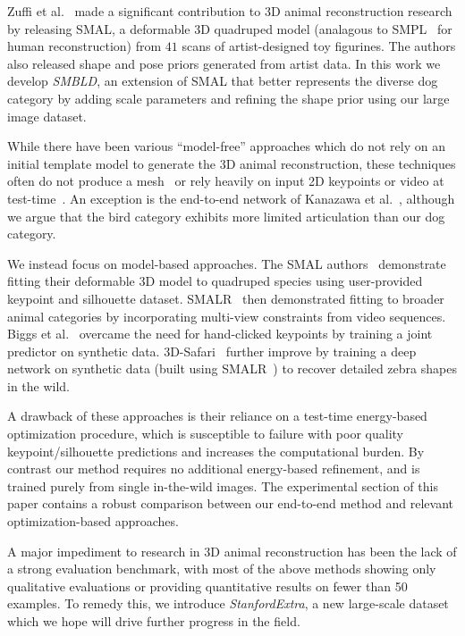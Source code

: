 
Zuffi et al.~\cite{zuffi2017menagerie} made a significant contribution to 3D animal reconstruction research by releasing SMAL, a deformable 3D quadruped model (analagous to SMPL~\cite{loper15smpl} for human reconstruction) from $41$ scans of artist-designed toy figurines. The authors also released shape and pose priors generated from artist data. In this work we develop \emph{SMBLD}, an extension of SMAL that better represents the diverse dog category by adding scale parameters and refining the shape prior using our large image dataset.

While there have been various ``model-free'' approaches which do not rely on an initial template model to generate the 3D animal reconstruction, these techniques often do not produce a mesh~\cite{Agudo_2018_CVPR,novotny19c3dpo} or rely heavily on input 2D keypoints or video at test-time~\cite{vicente_3dv,Probst2018_ECCVa}. An exception is the end-to-end network of Kanazawa et al.~\cite{kanazawa2018birds}, although we argue that the bird category exhibits more limited articulation than our dog category.

We instead focus on model-based approaches. The SMAL authors~\cite{zuffi2017menagerie} demonstrate fitting their deformable 3D model to quadruped species using user-provided keypoint and silhouette dataset. SMALR~\cite{zuffi_lions} then demonstrated fitting to broader animal categories by incorporating multi-view constraints from video sequences. Biggs et al.~\cite{biggs2018creatures} overcame the need for hand-clicked keypoints by training a joint predictor on synthetic data. 3D-Safari~\cite{Zuffi19Safari} further improve by training a deep network on synthetic data (built using SMALR~\cite{zuffi_lions}) to recover detailed zebra shapes in the wild.

A drawback of these approaches is their reliance on a test-time energy-based optimization procedure, which is susceptible to failure with poor quality keypoint/silhouette predictions and increases the computational burden. By contrast our method requires no additional energy-based refinement, and is trained purely from single in-the-wild images. The experimental section of this paper contains a robust comparison between our end-to-end method and relevant optimization-based approaches. 


A major impediment to research in 3D animal reconstruction has been the lack of a strong evaluation benchmark, with most of the above methods showing only qualitative evaluations or providing quantitative results on fewer than 50 examples. To remedy this, we introduce \emph{StanfordExtra}, a new large-scale dataset which we hope will drive further progress in the field. 
